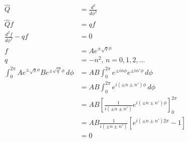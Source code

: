 \documentclass{article}
\begin{document}
\begin{enumerate}
        \begin{align*}
          \hat{Q}                                                                  & = \frac{d^2}{d \phi^2}                                                              \\
          \hat{Q} f                                                                & = q f                                                                               \\
          \frac{d^2 f}{d \phi^2} - q f                                             & = 0                                                                                 \\
          f                                                                        & = A e^{\pm \sqrt{q} \phi}                                                           \\
          q                                                                        & = -n^2, \,n = 0, 1, 2, \ldots                                                       \\
          \int_0^{2 \pi} A e^{\pm \sqrt{q} \phi} B e^{\pm \sqrt{q'} \phi} \,d \phi & = A B \int_0^{2 \pi} e^{\pm i n \phi} e^{\pm i n' \phi} \,d \phi                    \\
                                                                                   & = A B \int_0^{2 \pi} e^{i (\pm n \pm n') \phi} \,d \phi                             \\
                                                                                   & = A B \left[ \frac{1}{i (\pm n \pm n')} e^{i (\pm n \pm n') \phi} \right]_0^{2 \pi} \\
                                                                                   & = A B \frac{1}{i (\pm n \pm n')} [e^{i (\pm n \pm n') 2 \pi} - 1]                   \\
                                                                                   & = 0
        \end{align*}
\end{enumerate}
\end{document}
